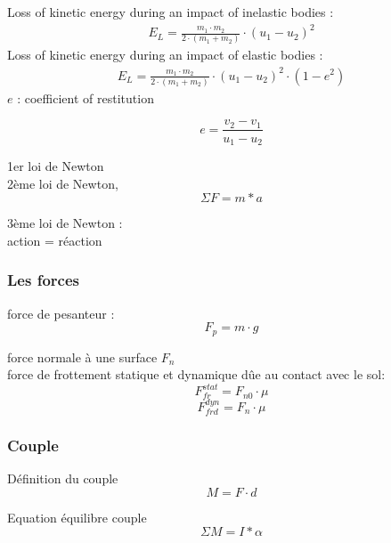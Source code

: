 Loss of kinetic energy during an impact of inelastic bodies : 
\begin{eqnarray}
E_L= \frac{m_1 \cdot m_2}{2 \cdot (m_1+m_2)} \cdot (u_1-u_2)^2
\end{eqnarray}
Loss of kinetic energy during an impact of elastic bodies : 
\begin{eqnarray}
E_L= \frac{m_1 \cdot m_2}{2 \cdot (m_1+m_2)} \cdot (u_1-u_2)^2 \cdot (1-e^2)
\end{eqnarray}
$e$ : coefficient of restitution

\begin{equation}
e=\frac{v_2-v_1}{u_1-u_2}
\end{equation}


1er loi de Newton \\


2ème loi de Newton, 
\begin{equation}
\Sigma F= m*a
\end{equation}

3ème loi de Newton : \\

action = réaction \\
\subsubsection{Les forces}
force de pesanteur : 
\begin{equation}
F_p=m \cdot g
\end{equation}

force normale à une surface $F_n$\\
force de frottement statique et dynamique dûe au contact avec le sol: 
\begin{equation}
F_{fr}^{stat}=F_{n0} \cdot \mu
\end{equation}
\begin{equation}
F_{frd}^{dyn}=F_n \cdot \mu
\end{equation}


\subsubsection{Couple}
Définition du couple
\begin{equation}
M=F \cdot d
\end{equation}

Equation équilibre couple
\begin{equation}
\Sigma M=I*\alpha
\end{equation}

